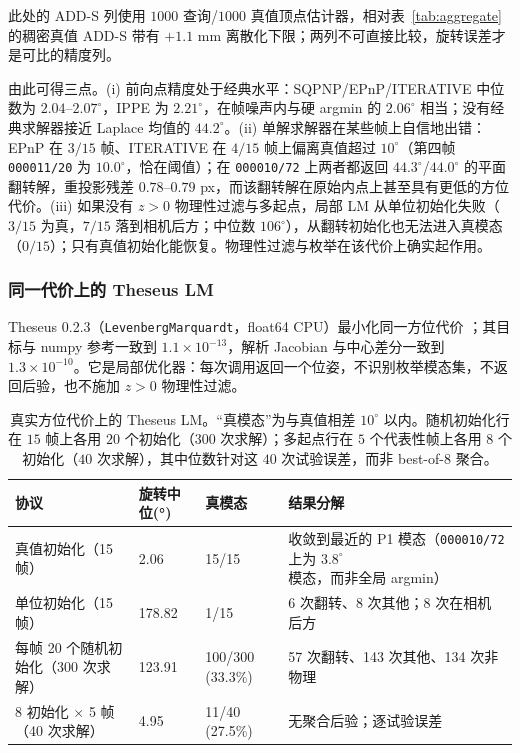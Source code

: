 此处的 ADD-S 列使用 $1000$ 查询/$1000$ 真值顶点估计器，相对表~\ref{tab:aggregate} 的稠密真值 ADD-S 带有 $+1.1$ mm 离散化下限；两列不可直接比较，旋转误差才是可比的精度列。

由此可得三点。(i) 前向点精度处于经典水平：SQPNP/EPnP/ITERATIVE 中位数为 $2.04$--$2.07^\circ$，IPPE 为 $2.21^\circ$，在帧噪声内与硬 argmin 的 $2.06^\circ$ 相当；没有经典求解器接近 Laplace 均值的 $44.2^\circ$。(ii) 单解求解器在某些帧上自信地出错：EPnP 在 $3/15$ 帧、ITERATIVE 在 $4/15$ 帧上偏离真值超过 $10^\circ$（第四帧 \texttt{000011/20} 为 $10.0^\circ$，恰在阈值）；在 \texttt{000010/72} 上两者都返回 $44.3^\circ$/$44.0^\circ$ 的平面翻转解，重投影残差 $0.78$--$0.79$ px，而该翻转解在原始内点上甚至具有更低的方位代价。(iii) 如果没有 $z>0$ 物理性过滤与多起点，局部 LM 从单位初始化失败（$3/15$ 为真，$7/15$ 落到相机后方；中位数 $106^\circ$），从翻转初始化也无法进入真模态（$0/15$）；只有真值初始化能恢复。物理性过滤与枚举在该代价上确实起作用。

\subsubsection{同一代价上的 Theseus LM}\label{sec:theseus}

Theseus 0.2.3（\texttt{LevenbergMarquardt}，float64 CPU）最小化同一方位代价 \cite{pineda2022theseus}；其目标与 numpy 参考一致到 $1.1\times10^{-13}$，解析 Jacobian 与中心差分一致到 $1.3\times10^{-10}$。它是局部优化器：每次调用返回一个位姿，不识别枚举模态集，不返回后验，也不施加 $z>0$ 物理性过滤。

\begin{table}[t]
\centering
\caption{真实方位代价上的 Theseus LM。“真模态”为与真值相差 $10^\circ$ 以内。随机初始化行在 $15$ 帧上各用 $20$ 个初始化（$300$ 次求解）；多起点行在 $5$ 个代表性帧上各用 $8$ 个初始化（$40$ 次求解），其中位数针对这 $40$ 次试验误差，而非 best-of-8 聚合。}
\label{tab:theseus}
\footnotesize
\setlength{\tabcolsep}{4pt}
\begin{tabular}{@{}l l l p{7.4cm}@{}}
\toprule
协议 & 旋转中位(°) & 真模态 & 结果分解\\
\midrule
真值初始化（15 帧） & 2.06 & 15/15 & 收敛到最近的 P1 模态（\texttt{000010/72} 上为 $3.8^\circ$ 模态，而非全局 argmin）\\
单位初始化（15 帧） & 178.82 & 1/15 & 6 次翻转、8 次其他；8 次在相机后方\\
每帧 20 个随机初始化（300 次求解） & 123.91 & 100/300 (33.3\%) & 57 次翻转、143 次其他、134 次非物理\\
8 初始化 $\times$ 5 帧（40 次求解） & 4.95 & 11/40 (27.5\%) & 无聚合后验；逐试验误差\\
\bottomrule
\end{tabular}
\end{table}

